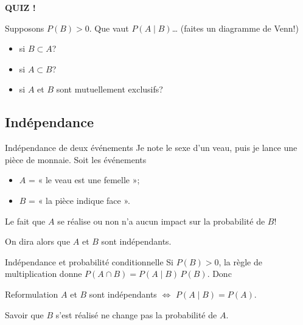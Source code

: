 \documentclass{BeamerTemplate}
\begin{document}
\begin{frame}[plain,t]
  \centerline{\LARGE\bfseries\alert{QUIZ !}}

  \medskip
  Supposons $P(B) > 0$. Que vaut $P(A \mid B)$\ldots
  {\small\color{gray} (faites un diagramme de Venn!)}
  \begin{itemize}\itemsep 1.2cm
    \item si $B \subset A$?
    \item si $A \subset B$?
    \item si $A$ et $B$ sont mutuellement exclusifs?
  \end{itemize}
\end{frame}

\subsection{Indépendance}

\begin{frame}[t]{Indépendance de deux événements}
  Je note le sexe d'un veau, puis je lance une pièce de monnaie. Soit les
  événements
  \begin{itemize}
    \item $A$ = « le veau est une femelle »;
    \item $B$ = « la pièce indique face ».
  \end{itemize}

  \medskip
  Le fait que $A$ se réalise ou non n'a aucun impact sur la probabilité de $B$!

  \medskip
  On dira alors que $A$ et $B$ sont \alert{indépendants}.

  \medskip
\end{frame}

\begin{frame}[t]{Indépendance et probabilité conditionnelle}
  Si $P(B) > 0$, la règle de multiplication donne
  $P(A \cap B) = P(A \mid B)\,P(B)$. Donc
  \begin{Boite}{Reformulation}
    $A$ et $B$ sont indépendants $\iff$ $P(A \mid B) = P(A)$.
  \end{Boite}
  Savoir que $B$ s'est réalisé \alert{ne change pas} la probabilité de $A$.

  \medskip
\end{frame}
\end{document}
